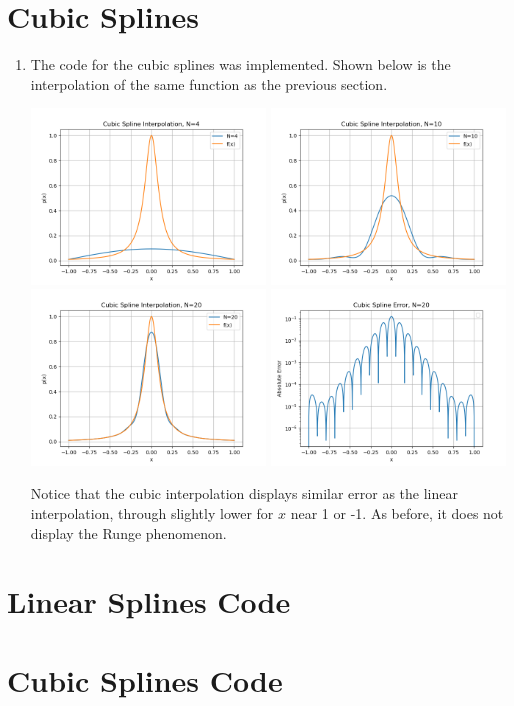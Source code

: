 \documentclass[10pt]{article}
\begin{document}
\section{Cubic Splines}
\begin{enumerate}
  \item The code for the cubic splines was implemented. Shown below is the interpolation of the same function as the previous section.
  
  \includegraphics[width=0.49\textwidth]{cubic4.png}
  \includegraphics[width=0.49\textwidth]{cubic10.png}
  \includegraphics[width=0.49\textwidth]{cubic20.png}
  \includegraphics[width=0.49\textwidth]{cubic_error20.png}

  Notice that the cubic interpolation displays similar error as the linear interpolation, through slightly lower for \(x\) near 1 or -1. As before, it does not display the Runge phenomenon.
\end{enumerate}

\section{Linear Splines Code}
{\small }

\section{Cubic Splines Code}
{\small }    
\end{document}
